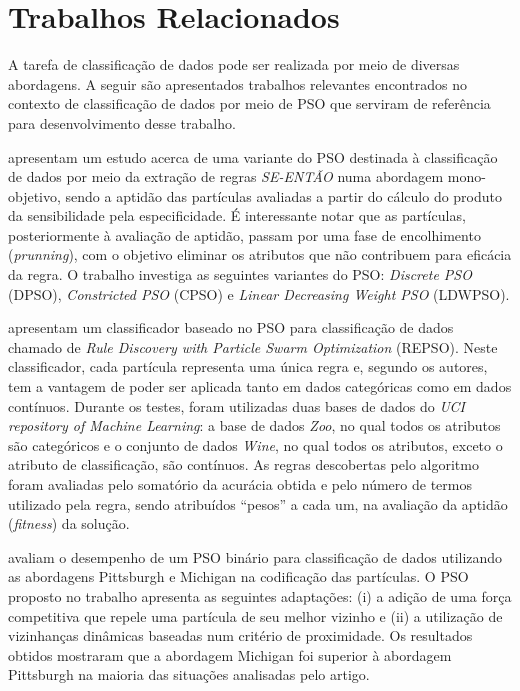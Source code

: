 \documentclass[
	12pt,				%
	openany,			%
	oneside,	
	a4paper,			%
	brazil,				%
	]{unimontes-ppgmsc-abntex2}
\begin{document}
\section{Trabalhos Relacionados}
\label{sec:trabalhos_relacionados}

A tarefa de classificação de dados pode ser realizada por meio de diversas abordagens. A seguir são apresentados trabalhos relevantes encontrados no contexto de classificação de dados por meio de PSO que serviram de referência para desenvolvimento desse trabalho.

 apresentam um estudo acerca de uma variante do PSO destinada à classificação de dados por meio da extração de regras {\em SE-ENTÃO} numa abordagem mono-objetivo, sendo a aptidão das partículas avaliadas a partir do cálculo do produto da sensibilidade pela especificidade. É interessante notar que as partículas, posteriormente à avaliação de aptidão, passam por uma fase de encolhimento ({\em prunning}), com o objetivo eliminar os atributos que não contribuem para eficácia da regra. O trabalho investiga as seguintes variantes do PSO: {\em Discrete PSO} (DPSO), {\em Constricted PSO} (CPSO) e {\em Linear Decreasing Weight PSO} (LDWPSO).

 apresentam um classificador baseado no PSO para classificação de dados chamado de {\em Rule Discovery with Particle Swarm Optimization} (REPSO). Neste classificador, cada partícula representa uma única regra e, segundo os autores, tem a vantagem de poder ser aplicada tanto em dados categóricas como em dados contínuos. Durante os testes, foram utilizadas duas bases de dados do {\em UCI repository of Machine Learning}: a base de dados {\em Zoo}, no qual todos os atributos são categóricos e o conjunto de dados {\em Wine}, no qual todos os atributos, exceto o atributo de classificação, são contínuos. As regras descobertas pelo algoritmo foram avaliadas pelo somatório da acurácia obtida e pelo número de termos utilizado pela regra, sendo atribuídos ``pesos'' a cada um, na avaliação da aptidão ({\em fitness}) da solução.

 avaliam o desempenho de um PSO binário para classificação de dados utilizando as abordagens Pittsburgh e Michigan na codificação das partículas. O PSO proposto no trabalho apresenta as seguintes adaptações: (i) a adição de uma força competitiva que repele uma partícula de seu melhor vizinho e (ii) a utilização de vizinhanças dinâmicas baseadas num critério de proximidade. Os resultados obtidos mostraram que a abordagem Michigan foi superior à abordagem Pittsburgh na maioria das situações analisadas pelo artigo.
\end{document}

